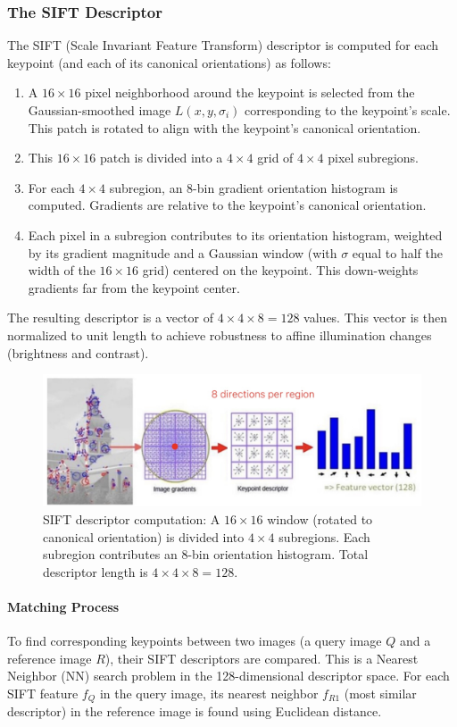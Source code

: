 \subsubsection{The SIFT Descriptor}
The SIFT (Scale Invariant Feature Transform) descriptor is computed for each keypoint (and each of its canonical orientations) as follows:
\begin{enumerate}
  \item A $16 \times 16$ pixel neighborhood around the keypoint is selected from the Gaussian-smoothed image $L(x,y,\sigma_i)$ corresponding to the keypoint's scale. This patch is rotated to align with the keypoint's canonical orientation.
  \item This $16 \times 16$ patch is divided into a $4 \times 4$ grid of $4 \times 4$ pixel subregions.
  \item For each $4 \times 4$ subregion, an 8-bin gradient orientation histogram is computed. Gradients are relative to the keypoint's canonical orientation.
  \item Each pixel in a subregion contributes to its orientation histogram, weighted by its gradient magnitude and a Gaussian window (with $\sigma$ equal to half the width of the $16 \times 16$ grid) centered on the keypoint. This down-weights gradients far from the keypoint center.
\end{enumerate}
The resulting descriptor is a vector of $4 \times 4 \times 8 = 128$ values. This vector is then normalized to unit length to achieve robustness to affine illumination changes (brightness and contrast).

\begin{figure}[htbp]
  \centering
  \includegraphics[width=0.8\linewidth]{./img/sift_descriptor.jpg}
  \caption{SIFT descriptor computation: A $16 \times 16$ window (rotated to canonical orientation) is divided into $4 \times 4$ subregions. Each subregion contributes an 8-bin orientation histogram. Total descriptor length is $4 \times 4 \times 8 = 128$.}
  \label{fig:sift_descriptor}
\end{figure}

\paragraph{Matching Process}
To find corresponding keypoints between two images (a query image $Q$ and a reference image $R$), their SIFT descriptors are compared. This is a Nearest Neighbor (NN) search problem in the 128-dimensional descriptor space.
For each SIFT feature $f_Q$ in the query image, its nearest neighbor $f_{R1}$ (most similar descriptor) in the reference image is found using Euclidean distance.

